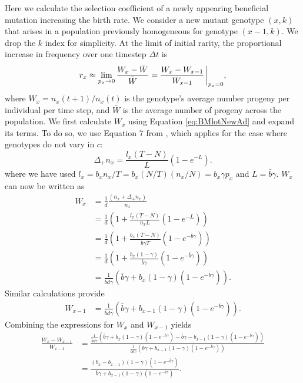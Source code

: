 \documentclass[9pt,twocolumn,twoside,lineno]{gsajnl}
\begin{document}
Here we calculate the selection coefficient of a newly appearing beneficial mutation increasing the birth rate. We consider a new mutant genotype $(x,k)$ that arises in a population previously homogeneous for genotype $(x-1,k)$. We drop the $k$ index for simplicity. At the limit of initial rarity, the proportional increase in frequency over one timestep $\Delta t$ is 
\begin{equation} \label{eq:sec:C:start}
    {r_x \approx \lim_{p_x\rightarrow 0} \frac{W_x-\bar{W}}{\bar{W}} = \frac{W_x-W_{x-1}}{W_{x-1}}\eval_{p_x=0}},
\end{equation}
where $W_{x}=n_{x}(t+1)/n_x(t)$ is the genotype's average number progeny per individual per time step, and $\bar{W}$ is the average number of progeny across the population. We first calculate $W_{x}$ using Equation \eqref{eq:BMlotNewAd} and expand its terms. To do so, we use Equation 7 from \cite{bertram2019density}, which applies for the case where genotypes do not vary in $c$:
\[
\Delta_+ n_x = \frac{l_x(T-N)}{L}(1-e^{-L}).
\]
where we have used $l_x = b_x n_x/T = b_x(N/T)(n_x/N) = b_x\gamma p_x$ and $L=\bar{b}\gamma$. $W_x$ can now be written as
\[
\begin{aligned}
W_{x} &= \frac{1}{d}\frac{(n_x + \Delta_+ n_x)}{n_x}\\
&= \frac{1}{d}\left(1 + \frac{l_x(T-N)}{n_xL}(1-e^{-L}) \right)\\
&=\frac{1}{d}\left(1 + \frac{b_x(T-N)}{\bar{b}\gamma T}(1-e^{-\bar{b}\gamma}) \right)\\
&=\frac{1}{d}\left(1 + \frac{b_x(1-\gamma)}{\bar{b}\gamma}(1-e^{-\bar{b}\gamma}) \right)\\
&=\frac{1}{\bar{b}d\gamma}\left(\bar{b}\gamma + b_x(1-\gamma)(1-e^{-\bar{b}\gamma}) \right).
\end{aligned}
\]
Similar calculations provide 
\[
\begin{aligned}
W_{x-1} &=\frac{1}{\bar{b}d\gamma} \left( \bar{b}\gamma + b_{x-1}(1-\gamma)(1-e^{-\bar{b}\gamma}) \right).
\end{aligned}
\]
Combining the expressions for $W_x$ and $W_{x-1}$ yields
\[
\begin{aligned}
\frac{W_x-W_{x-1}}{W_{x-1}} &= \frac{\frac{1}{\bar{b}d\gamma}\left(\bar{b}\gamma+b_x(1-\gamma)(1-e^{-\bar{b}\gamma})-\bar{b}\gamma-b_{x-1}(1-\gamma)(1-e^{-\bar{b}\gamma}) \right)} {\frac{1}{\bar{b}d\gamma}\left(\bar{b}\gamma + b_{x-1}(1-\gamma)(1-e^{-\bar{b}\gamma})\right)} \\[4pt]
&= \frac{(b_x-b_{x-1})(1-\gamma)(1-e^{-\bar{b}\gamma})}{\bar{b}\gamma + b_{x-1}(1-\gamma)(1-e^{-\bar{b}\gamma})}.\\[4pt]
\end{aligned}
\]
\end{document}
